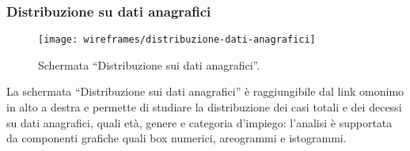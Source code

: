 \documentclass[../../../main.tex]{subfiles}
\begin{document}
\subsubsection{Distribuzione su dati anagrafici}\label{ss:distribuzione-su-dati-anagrafici}
\begin{figure}[H]
    \centering
    \texttt{[image: wireframes/distribuzione-dati-anagrafici]}
    \caption{Schermata ``Distribuzione sui dati anagrafici''.}
    \label{fig:distribuzione-dati-anagrafici}
\end{figure}
La schermata ``Distribuzione sui dati anagrafici'' è raggiungibile dal link omonimo in alto a destra e permette di studiare la distribuzione dei casi totali e dei decessi su dati anagrafici, quali età, genere e categoria d'impiego: l'analisi è supportata da componenti grafiche quali box numerici, areogrammi e istogrammi.
\end{document}
